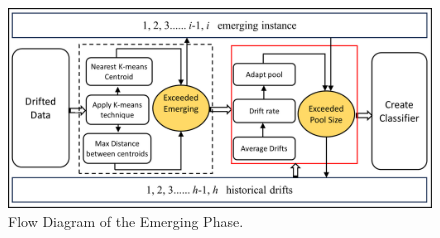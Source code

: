 \begin{figure}[ht]
	\centering
	\includegraphics[width=1\linewidth]{5_Emerging/images/pro2.png}
	\caption{Flow Diagram of the Emerging Phase.}
	\label{fig:proposal_step_2}
\end{figure}
